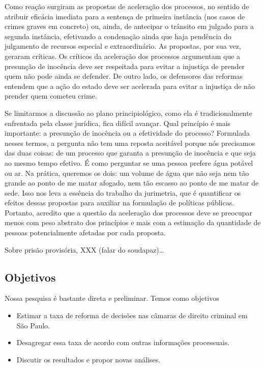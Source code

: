 \documentclass[10pt,]{article}
\begin{document}
Como reação surgiram as propostas de aceleração dos processos, no
sentido de atribuir eficácia imediata para a sentença de primeira
instância (nos casos de crimes graves em concreto) ou, ainda, de
antecipar o trânsito em julgado para a segunda instância, efetivando a
condenação ainda que haja pendência do julgamento de recursos especial e
extraordinário. As propostas, por sua vez, geraram críticas. Os críticos
da aceleração dos processos argumentam que a presunção de inocência deve
ser respeitada para evitar a injustiça de prender quem não pode ainda se
defender. De outro lado, os defensores das reformas entendem que a ação
do estado deve ser acelerada para evitar a injustiça de não prender quem
cometeu crime.

Se limitarmos a discussão ao plano principiológico, como ela é
tradicionalmente enfrentada pela classe jurídica, fica difícil avançar.
Qual princípio é mais importante: a presunção de inocência ou a
efetividade do processo? Formulada nesses termos, a pergunta não tem uma
reposta aceitável porque nós precisamos das duas coisas: de um processo
que garanta a presunção de inocência e que seja\\ao mesmo tempo efetivo.
É como perguntar se uma pessoa prefere água potável ou ar. Na prática,
queremos os dois: um volume de água que não seja nem tão grande ao ponto
de me matar afogado, nem tão escasso ao ponto de me matar de sede. Isso
nos leva a essência do trabalho da jurimetria, que é quantificar os
efeitos dessas propostas para auxiliar na formulação de políticas
públicas. Portanto, acredito que a questão da aceleração dos processos
deve se preocupar menos com peso abstrato dos princípios e mais com a
estimação da quantidade de pessoas potencialmente afetadas por cada
proposta.

Sobre prisão provisória, XXX (falar do soudapaz)\ldots{}

\subsection{Objetivos}\label{objetivos}

Nossa pesquisa é bastante direta e preliminar. Temos como objetivos

\begin{itemize}
\itemsep1pt\parskip0pt
\item
  Estimar a taxa de reforma de decisões nas câmaras de direito criminal
  em São Paulo.
\item
  Desagregar essa taxa de acordo com outras informações processuais.
\item
  Discutir os resultados e propor novas análises.
\end{itemize}
\end{document}
